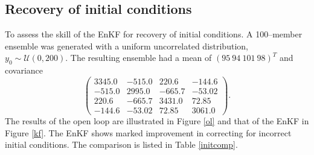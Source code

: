 \documentclass[fleqn, letterpaper]{article}
\numberwithin{figure}{section}
\begin{document}
\subsection{Recovery of initial conditions}
To assess the skill of the EnKF for recovery of initial conditions. A 100--member ensemble was generated with a uniform uncorrelated distribution, $y_0\sim\mathcal{U}(0,200)$.
The resulting ensemble had a mean of $(95\ 94\ 101\ 98)^T$ and covariance
\[\left(\begin{array}{cccc} 3345.0 & -515.0 & 220.6 & -144.6\\ -515.0 & 2995.0 & -665.7 & -53.02\\ 220.6 & -665.7 & 3431.0 & 72.85\\ -144.6 & -53.02 & 72.85 & 3061.0 \end{array}\right).\]
The results of the open loop are illustrated in Figure \ref{ol} and that of the EnKF in Figure \ref{kf}. The EnKF shows marked improvement in correcting for incorrect initial conditions. The comparison is listed in Table \ref{initcomp}.
\end{document}
